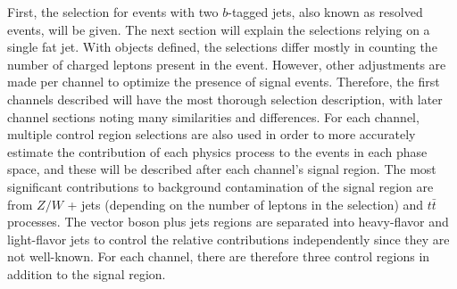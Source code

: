 First, the selection for events with two $b$-tagged jets,
also known as resolved events, will be given.
The next section will explain the selections relying on a single fat jet.
With objects defined, the selections differ mostly in counting the number
of charged leptons present in the event.
However, other adjustments are made per channel to optimize the presence of signal events.
Therefore, the first channels described will have the most thorough selection description,
with later channel sections noting many similarities and differences.
For each channel,
multiple control region selections are also used in order to more accurately
estimate the contribution of each physics process to the events in each phase space,
and these will be described after each channel's signal region.
The most significant contributions to background contamination of the signal region are from
$Z/W$ + jets (depending on the number of leptons in the selection) and $t\bar{t}$ processes.
The vector boson plus jets regions are separated into heavy-flavor and light-flavor jets
to control the relative contributions independently since they are not well-known.
For each channel, there are therefore three control regions in addition to the signal region.

